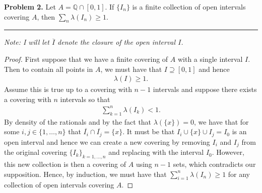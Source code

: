 \documentclass[leqno]{article}
\theoremstyle{nonumberplain}
\newtheorem{proof}{Proof}
\begin{document}
\pagebreak



\noindent\textbf{Problem 2.} \quad
Let $ A = \mathbb{Q} \cap [0,1] $.
If $ \{ I_n \} $ is a finite collection of open intervals covering $ A $,
then $ \sum_{n} \lambda(I_n) \geq 1 $.

\noindent\rule[0.5ex]{\linewidth}{1pt}

\noindent \emph{Note: I will let $\overline{I}$ denote the closure of the open interval $I$.}

\begin{proof}
First suppose that we have a finite covering of $A$ with a single interval $I$.  Then to contain all points in $A$, we must have that $I\supseteq [0,1]$ and hence
\begin{align*}
\lambda(I)\geq 1.
\end{align*}
Assume this is true up to a covering with $n-1$ intervals and suppose there exists a covering with $n$ intervals so that 
\begin{align*}
\sum_{k=1}^n \lambda(I_k) < 1.
\end{align*}
By density of the rationals and by the fact that $\lambda(\{x\})=0$, we have that for some $i,j\in \{1,\dots,n\}$ that $\overline{I_i}\cap \overline{I_j} = \{x\}$.  It must be that $I_i\cup \{x\} \cup I_j=I_{0}$ is an open interval and hence we can create a new covering by removing $I_i$ and $I_j$ from the original covering $\{I_k\}_{k=1,\dots,n}$ and replacing with the interval $I_0$. However, this new collection is then a covering of $A$ using $n-1$ sets, which contradicts our supposition.  Hence, by induction, we must have that $\sum_{i=1}^n \lambda(I_n)\geq 1$ for any collection of open intervals covering $A$.  
\end{proof}


\pagebreak

\end{document}
